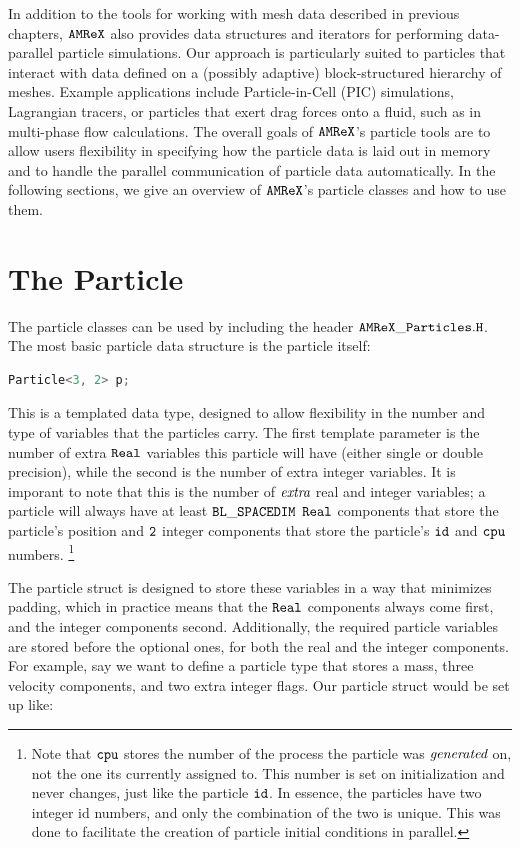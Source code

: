 In addition to the tools for working with mesh data described in previous chapters, $\tt{AMReX}$ also provides data structures and iterators for performing data-parallel particle simulations. Our approach is particularly suited to particles that interact with data defined on a (possibly adaptive) block-structured hierarchy of meshes. Example applications include Particle-in-Cell (PIC) simulations, Lagrangian tracers, or particles that exert drag forces onto a fluid, such as in multi-phase flow calculations. The overall goals of $\tt{AMReX}$'s particle tools are to allow users flexibility in specifying how the particle data is laid out in memory and to handle the parallel communication of particle data automatically. In the following sections, we give an overview of $\tt{AMReX}$'s particle classes and how to use them.

\section{The Particle}
\label{sec:Particles:Particle}

The particle classes can be used by including the header $\tt{AMReX\_Particles.H}$. The most basic particle data structure is the particle itself: 

\begin{lstlisting}[language=cpp]
  Particle<3, 2> p;
\end{lstlisting}

This is a templated data type, designed to allow flexibility in the number and type of variables that the particles carry. The first template parameter is
the number of extra $\tt{Real}$ variables this particle will have (either single or double precision), while the second is the number of extra integer variables. 
It is imporant to note that this is the number of $\emph{extra}$ real and integer variables; a particle will always have at least $\tt{BL\_SPACEDIM}$ $\tt{Real}$ components that store the particle's position and $\tt{2}$ integer components that store the particle's $\tt{id}$ and $\tt{cpu}$ numbers.
\footnote{Note that $\tt{cpu}$ stores the number of the process the particle was $\emph{generated}$ on, not the one its currently assigned to. This number is set on initialization and never changes, just like the particle $\tt{id}$. In essence, the particles have two integer id numbers, and only the combination of the two is unique. This was done to facilitate the creation of particle initial conditions in parallel.}

The particle struct is designed to store these variables in a way that minimizes padding, which in practice means that the $\tt{Real}$ components always come first, and the integer components second. Additionally, the required particle variables are stored before the optional ones, for both the real and the integer components. For example, say we want to define a particle type that stores a mass, three velocity components, and two extra integer flags. Our particle struct would be set up like:

